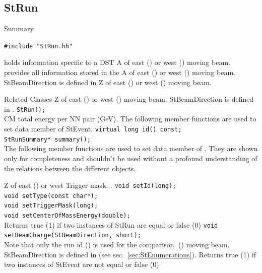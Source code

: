 \begin{Entry}
\subsection{StRun}
    
\label{sec:StRun}

\item[Summary]

    \verb+#include "StRun.hh"+\\
    
     holds information specific to a DST
    A of east () or west () moving beam.
    provides all information stored in the 
    A of east () or west () moving beam.
    StBeamDirection is defined in 
    Z of east () or west () moving beam.
\item[Related Classes]
    Z of east () or west () moving beam.
    StBeamDirection is defined in .
    \verb+StRun();+ \\
     CM total energy per NN pair (GeV).
    The following member functions are used to set data member of StEvent.
    \verb+virtual long id() const;+\\
    \verb+StRunSummary* summary();+\\
    The following member functions are used to set data member of .
    They are shown only for completeness and shouldn't be used without
    a profound understanding of the relations between the different objects.    
    
     Z of east () or west
    Trigger mask. 
    .
    \verb+void setId(long);+\\
    \verb+void setType(const char*);+\\
    \verb+void setTriggerMask(long);+\\
    \verb+void setCenterOfMassEnergy(double);+\\
    Returns true (1) if two instances of StRun are equal or false (0)
    \verb+void setBeamCharge(StBeamDirection, short);+\\
    Note that only the run id () is used for the comparison.
    () moving beam.  StBeamDirection is defined in
     (see sec.~\ref{sec:StEnumerations}).
    Returns true (1) if two instances of StEvent are not equal or false (0)
    

\end{Entry}
